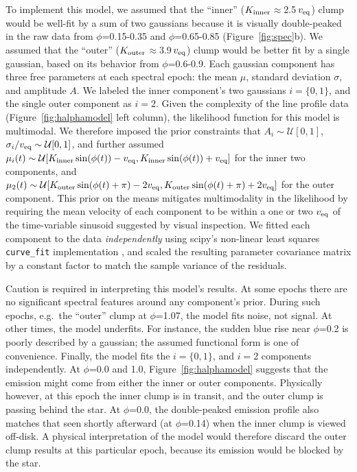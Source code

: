 \documentclass[11pt,twocolumn,tighten,linenumbers]{aastex7}
\begin{document}
To implement this model, we assumed that the ``inner'' ($K_{\rm
inner}$$\approx$2.5\,$v_{\rm eq}$) clump would be well-fit by a sum of
two gaussians because it is visually double-peaked in the raw data
from $\phi$=0.15-0.35 and $\phi$=0.65-0.85 (Figure~\ref{fig:spec}b).
We assumed that the ``outer'' ($K_{\rm outer}$$\approx$3.9\,$v_{\rm
eq}$) clump would be better fit by a single gaussian, based on its
behavior from $\phi$=0.6-0.9.  Each gaussian component has three free
parameters at each spectral epoch: the mean $\mu$, standard deviation
$\sigma$, and amplitude $A$.  We labeled the inner component's two
gaussians $i=\{ 0, 1 \}$, and the single outer component as $i=2$.
Given the complexity of the line profile data
(Figure~\ref{fig:halphamodel} left column), the likelihood function
for this model is multimodal.  We therefore imposed the prior
constraints that $A_i \sim \mathcal{U}[0,1]$,
$\sigma_i/v_{\rm eq} \sim \mathcal{U}[0,1]$, and further assumed
$\mu_i(t) \sim
\mathcal{U}[
  K_{\rm inner}\sin(\phi(t)) - v_{\rm eq},
  K_{\rm inner}\sin(\phi(t)) + v_{\rm eq}
]$
for the inner two components, and
$\mu_2(t) \sim
\mathcal{U}[
  K_{\rm outer}\sin(\phi(t) + \pi) - 2v_{\rm eq},
  K_{\rm outer}\sin(\phi(t) + \pi) + 2v_{\rm eq}
]$
for the outer component.  This prior on the means mitigates
multimodality in the likelihood by requiring the mean velocity of each
component to be within a one or two $v_{\rm eq}$ of the time-variable
sinusoid suggested by visual inspection.  We fitted each component to
the data {\it independently} using scipy's non-linear least squares
\texttt{curve\_fit} implementation \citep{Virtanen2020}, and scaled the
resulting parameter covariance matrix by a constant factor to match
the sample variance of the residuals.

Caution is required in interpreting this model's results.  At some
epochs there are no significant spectral features around any component's
prior.  During such epochs, e.g.~the
``outer'' clump at $\phi$=1.07, the model fits noise, not signal.  At
other times, the model underfits.  For instance, the sudden blue rise
near $\phi$=0.2 is poorly described by a gaussian; the assumed
functional form is one of convenience.  Finally, the model fits the
$i=\{ 0, 1 \}$, and $i=2$ components independently.  At $\phi$=0.0 and
1.0, Figure~\ref{fig:halphamodel} suggests that the emission might
come from either the inner or outer components.  Physically however,
at this epoch the inner clump is in transit, and the outer clump is
passing behind the star.  At $\phi$=0.0, the double-peaked emission
profile also matches that seen shortly afterward (at $\phi$=0.14) when
the inner clump is viewed off-disk.  A physical interpretation of the
model would therefore discard the outer clump results at this
particular epoch, because its emission would be blocked by the star.
\end{document}
